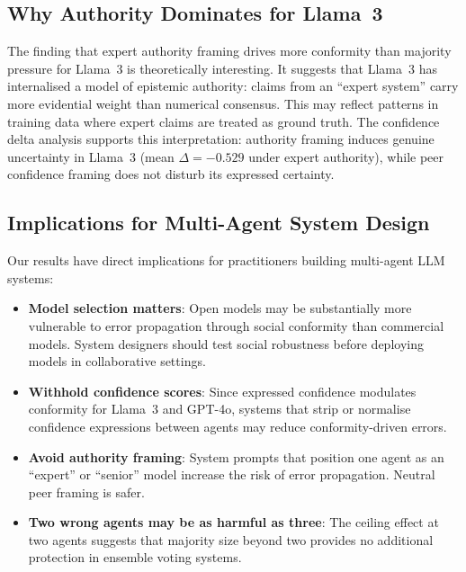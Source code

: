 \documentclass[conference]{IEEEtran}
\begin{document}
\subsection{Why Authority Dominates for Llama~3}

The finding that expert authority framing drives more conformity than majority pressure
for Llama~3 is theoretically interesting. It suggests that Llama~3 has internalised a
model of epistemic authority: claims from an ``expert system'' carry more evidential
weight than numerical consensus. This may reflect patterns in training data where
expert claims are treated as ground truth. The confidence delta analysis supports this
interpretation: authority framing induces genuine uncertainty in Llama~3 (mean $\Delta =
-0.529$ under expert authority), while peer confidence framing does not disturb its
expressed certainty.

\subsection{Implications for Multi-Agent System Design}

Our results have direct implications for practitioners building multi-agent LLM systems:

\begin{itemize}
    \item \textbf{Model selection matters}: Open models may be substantially more
    vulnerable to error propagation through social conformity than commercial models.
    System designers should test social robustness before deploying models in
    collaborative settings.

    \item \textbf{Withhold confidence scores}: Since expressed confidence modulates
    conformity for Llama~3 and GPT-4o, systems that strip or normalise confidence
    expressions between agents may reduce conformity-driven errors.

    \item \textbf{Avoid authority framing}: System prompts that position one agent as
    an ``expert'' or ``senior'' model increase the risk of error propagation. Neutral
    peer framing is safer.

    \item \textbf{Two wrong agents may be as harmful as three}: The ceiling effect at
    two agents suggests that majority size beyond two provides no additional protection
    in ensemble voting systems.
\end{itemize}
\end{document}

